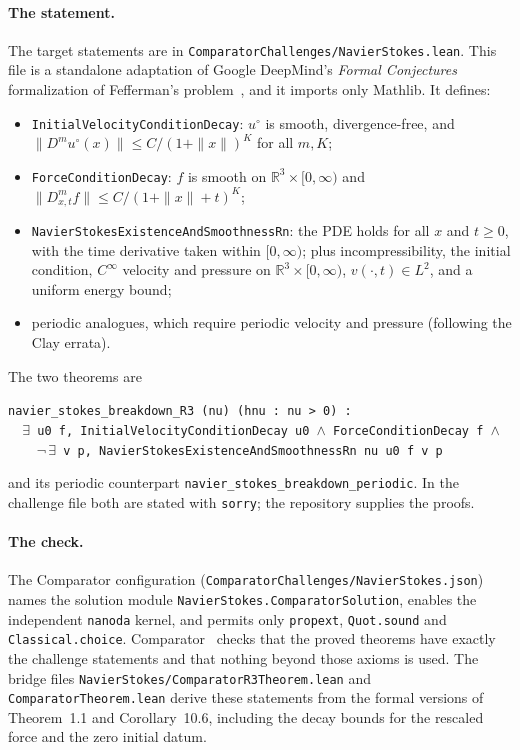 \documentclass[11pt]{article}
\newcommand{\R}{\mathbb{R}}
\theoremstyle{plain}
\theoremstyle{remark}
\begin{document}
\paragraph{The statement.} The target statements are in \texttt{ComparatorChallenges/NavierStokes.lean}. This file is a standalone adaptation of Google DeepMind's \emph{Formal Conjectures} formalization of Fefferman's problem~\cite{FC}, and it imports only Mathlib. It defines:
\begin{itemize}[itemsep=1pt]
\item \texttt{InitialVelocityConditionDecay}: $u^\circ$ is smooth, divergence-free, and $\|D^mu^\circ(x)\|\le C/(1+\|x\|)^K$ for all $m,K$;
\item \texttt{ForceConditionDecay}: $f$ is smooth on $\R^3\times[0,\infty)$ and $\|D^m_{x,t}f\|\le C/(1+\|x\|+t)^K$;
\item \texttt{NavierStokesExistenceAndSmoothnessRn}: the PDE holds for all $x$ and $t\ge0$, with the time derivative taken within $[0,\infty)$; plus incompressibility, the initial condition, $C^\infty$ velocity and pressure on $\R^3\times[0,\infty)$, $v(\cdot,t)\in L^2$, and a uniform energy bound;
\item periodic analogues, which require periodic velocity and pressure (following the Clay errata).
\end{itemize}
The two theorems are
\begin{center}\small
\texttt{navier\_stokes\_breakdown\_R3 (nu) (hnu : nu > 0) :}\\
\texttt{\ \ $\exists$ u0 f, InitialVelocityConditionDecay u0 $\wedge$ ForceConditionDecay f $\wedge$}\\
\texttt{\ \ \ \ $\neg\,\exists$ v p, NavierStokesExistenceAndSmoothnessRn nu u0 f v p}
\end{center}
and its periodic counterpart \texttt{navier\_stokes\_breakdown\_periodic}. In the challenge file both are stated with \texttt{sorry}; the repository supplies the proofs.

\paragraph{The check.} The Comparator configuration (\texttt{ComparatorChallenges/NavierStokes.json}) names the solution module \texttt{NavierStokes.ComparatorSolution}, enables the independent \texttt{nanoda} kernel, and permits only \texttt{propext}, \texttt{Quot.sound} and \texttt{Classical.choice}. Comparator~\cite{Comparator} checks that the proved theorems have exactly the challenge statements and that nothing beyond those axioms is used. The bridge files \texttt{NavierStokes/ComparatorR3Theorem.lean} and \texttt{ComparatorTheorem.lean} derive these statements from the formal versions of Theorem~1.1 and Corollary~10.6, including the decay bounds for the rescaled force and the zero initial datum.
\end{document}
